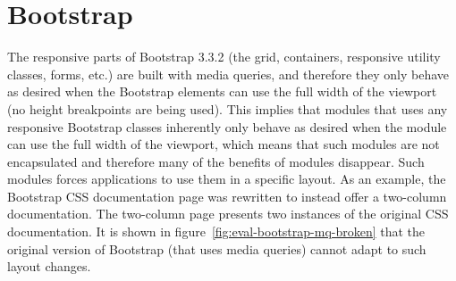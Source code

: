 \documentclass[a4paper,11pt]{kth-mag}
\begin{document}
    \section{Bootstrap}\label{sec:eval-bootstrap}
      The responsive parts of Bootstrap 3.3.2 (the grid, containers, responsive utility classes, forms, etc.) are built with media queries, and therefore they only behave as desired when the Bootstrap elements can use the full width of the viewport (no height breakpoints are being used).
      This implies that modules that uses any responsive Bootstrap classes inherently only behave as desired when the module can use the full width of the viewport, which means that such modules are not encapsulated and therefore many of the benefits of modules disappear.
      Such modules forces applications to use them in a specific layout.
      As an example, the Bootstrap \gls{CSS} documentation page was rewritten to instead offer a two-column documentation.
      The two-column page presents two instances of the original \gls{CSS} documentation.
      It is shown in figure~\ref{fig:eval-bootstrap-mq-broken} that the original version of Bootstrap (that uses media queries) cannot adapt to such layout changes.
\end{document}
